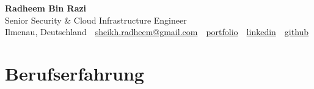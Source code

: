 \documentclass[11pt,a4paper]{resume}
\makeatletter
\newcommand{\Portfolio}{https://radheem.github.io/my-cv}
\newcommand{\PortfolioText}{portfolio}
\newcommand{\GitHub}{https://github.com/radheem}
\newcommand{\LinkedIn}{https://www.linkedin.com/in/radheem-razi}
\newcommand{\Email}{sheikh.radheem@gmail.com}
\makeatother
\begin{document}
\clearpage
{}

\begin{center}
  {\huge\bfseries Radheem Bin Razi}\\[3pt]
  {\large Senior Security \& Cloud Infrastructure Engineer}\\[6pt]
  \small
  Ilmenau, Deutschland \,\textbar\,
  \href{mailto:\Email}{\Email} \,\textbar\,
  \href{\Portfolio}{\PortfolioText} \,\textbar\,
  \href{\LinkedIn}{linkedin} \,\textbar\,
  \href{\GitHub}{github}
\end{center}
\vspace{2pt}

\section{Berufserfahrung}
\end{document}
